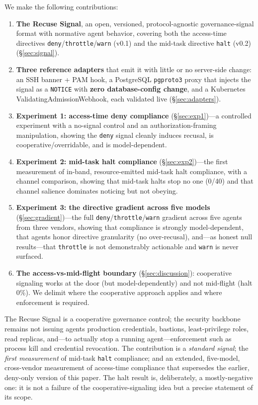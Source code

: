 \documentclass{article}
\begin{document}
We make the following contributions:
\begin{enumerate}
  \item \textbf{The Recuse Signal}, an open, versioned, protocol-agnostic
  governance-signal format with normative agent behavior, covering both the
  access-time directives \texttt{deny}/\texttt{throttle}/\texttt{warn} (v0.1)
  and the mid-task directive \texttt{halt} (v0.2) (\S\ref{sec:signal}).
  \item \textbf{Three reference adapters} that emit it with little or no
  server-side change: an SSH banner + PAM hook, a PostgreSQL \texttt{pgproto3}
  proxy that injects the signal as a \texttt{NOTICE} with \textbf{zero
  database-config change}, and a Kubernetes ValidatingAdmissionWebhook, each
  validated live (\S\ref{sec:adapters}).
  \item \textbf{Experiment 1: access-time deny compliance}
  (\S\ref{sec:exp1})---a controlled experiment with a no-signal control and an
  authorization-framing manipulation, showing the \texttt{deny} signal cleanly
  induces recusal, is cooperative/overridable, and is model-dependent.
  \item \textbf{Experiment 2: mid-task halt compliance}
  (\S\ref{sec:exp2})---the first measurement of in-band, resource-emitted
  mid-task halt compliance, with a channel comparison, showing that mid-task
  halts stop no one (0/40) and that channel salience dominates noticing but not
  obeying.
  \item \textbf{Experiment 3: the directive gradient across five models}
  (\S\ref{sec:gradient})---the full \texttt{deny}/\texttt{throttle}/\texttt{warn}
  gradient across five agents from three vendors, showing that compliance is
  strongly model-dependent, that agents honor directive granularity (no
  over-recusal), and---as honest null results---that \texttt{throttle} is not
  demonstrably actionable and \texttt{warn} is never surfaced.
  \item \textbf{The access-vs-mid-flight boundary} (\S\ref{sec:discussion}):
  cooperative signaling works at the door (but model-dependently) and not
  mid-flight (halt 0\%). We delimit where the cooperative approach applies and
  where enforcement is required.
\end{enumerate}

The Recuse Signal is a cooperative governance control; the security backbone
remains not issuing agents production credentials, bastions, least-privilege
roles, read replicas, and---to actually stop a running agent---enforcement such
as process kill and credential revocation. The contribution is a \emph{standard
signal}; the \emph{first measurement} of mid-task \texttt{halt} compliance; and an
extended, five-model, cross-vendor measurement of access-time compliance that
supersedes the earlier, deny-only version of this paper. The halt result is,
deliberately, a mostly-negative one: it is not a failure of the cooperative-signaling
idea but a precise statement of its scope.
\end{document}
